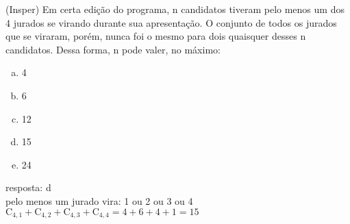 \begin{ex}
  (Insper) Em certa edição do programa, n candidatos tiveram pelo menos um dos 4 jurados se virando durante sua apresentação. O conjunto de todos os jurados que se viraram, porém, nunca foi o mesmo para dois quaisquer desses n candidatos. Dessa forma, n pode valer, no máximo:
    \begin{enumerate}  [(a)]
        \item 4
        \item 6
        \item 12
        \item 15
        \item 24
    \end{enumerate}
      \begin{sol}
       resposta: d \\
       pelo menos um jurado vira: 1 ou 2 ou 3 ou 4 \\
       $\mathrm{C}_{4,1}+\mathrm{C}_{4,2}+\mathrm{C}_{4,3}+\mathrm{C}_{4,4}=4+6+4+1=15$
      \end{sol}
 \end{ex}
